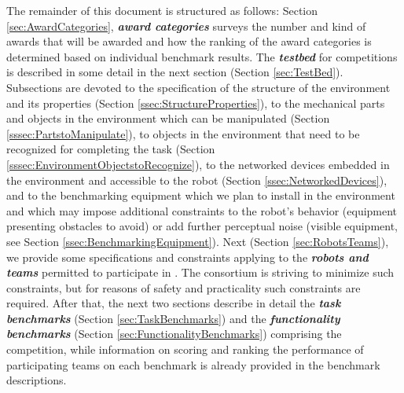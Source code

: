 The remainder of this document is structured as follows:
Section \ref{sec:AwardCategories}, \emph{\textbf{award categories}} surveys the number and kind of awards that will be awarded and how the ranking of the award categories is determined based on individual benchmark results.
The \emph{\textbf{testbed}} for \erlir competitions is described in some detail in the next section (Section \ref{sec:TestBed}). 
Subsections are devoted to the specification of the structure of the environment and its properties (Section \ref{ssec:StructureProperties}), to the mechanical parts and objects in the environment which can be manipulated (Section \ref {sssec:PartstoManipulate}), to objects in the environment that need to be recognized for completing the task (Section \ref{sssec:EnvironmentObjectstoRecognize}), to the networked devices embedded in the environment and accessible to the robot (Section \ref{ssec:NetworkedDevices}), and to the benchmarking equipment which we plan to install in the environment and which may impose additional constraints to the robot's behavior (equipment presenting obstacles to avoid) or add further perceptual noise (visible equipment, see Section \ref{ssec:BenchmarkingEquipment}).
Next (Section \ref{sec:RobotsTeams}), we provide some specifications and constraints applying to the \emph{\textbf{robots and teams}} permitted to participate in \erlir. 
The \erl consortium is striving to minimize such constraints, but for reasons of safety and practicality such constraints are required. 
After that, the next two sections describe in detail the \emph{\textbf{task benchmarks}} (Section \ref{sec:TaskBenchmarks}) and the \emph{\textbf{functionality benchmarks}} (Section \ref{sec:FunctionalityBenchmarks}) comprising the \erlir competition, while information on scoring and ranking the performance of participating teams on each benchmark is already provided in the benchmark descriptions.%



